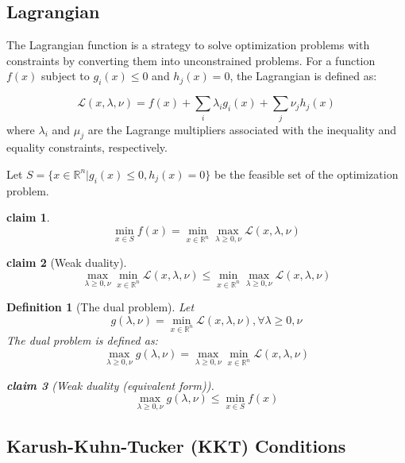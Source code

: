 \documentclass[11pt]{book} %
\newtheorem{definition}{Definition}[section]
\newtheorem{claim}{claim}[section]
\begin{document}
%
%

\subsection{Lagrangian}

The Lagrangian function is a strategy to solve optimization problems with constraints by converting them into unconstrained problems. For a function \( f(x) \) subject to \( g_i(x) \leq 0 \) and \( h_j(x) = 0 \), the Lagrangian is defined as:

\[
\mathcal{L}(x, \lambda, \nu ) = f(x) + \sum_{i}\lambda_i g_i(x) + \sum_{j}\nu_j h_j(x)
\]
where \( \lambda_i \) and \( \mu_j \) are the Lagrange multipliers associated with the inequality and equality constraints, respectively.

Let $S = \{x \in \mathbb{R}^n | g_i(x) \leq 0, h_j(x) = 0\}$ be the feasible set of the optimization problem. 
\begin{claim}
\[
    \min_{x \in S} f(x) = \min_{x \in \mathbb{R}^n} \max_{\lambda \geq 0, \nu} \mathcal{L}(x, \lambda, \nu)
\]
\end{claim}

\begin{claim}[Weak duality]
\[
    \max_{\lambda \geq 0, \nu} \min_{x \in \mathbb{R}^n} \mathcal{L}(x, \lambda, \nu) \leq \min_{x \in \mathbb{R}^n} \max_{\lambda \geq 0, \nu} \mathcal{L}(x, \lambda, \nu)
\]  
\end{claim}

\begin{definition}[The dual problem]
Let 
\[
  g(\lambda, \nu) = \min_{x \in \mathbb{R}^n} \mathcal{L}(x, \lambda, \nu),        \forall \lambda \geq 0, \nu  
\]
The dual problem is defined as:
\[
    \max_{\lambda \geq 0, \nu} g(\lambda, \nu) = \max_{\lambda \geq 0, \nu} \min_{x \in \mathbb{R}^n} \mathcal{L}(x, \lambda, \nu)
\]

\begin{claim}[Weak duality (equivalent form)]
\[
    \max_{\lambda \geq 0, \nu} g(\lambda, \nu) \leq \min_{x \in S} f(x)
\]
\end{claim}
\end{definition}

\subsection{Karush-Kuhn-Tucker (KKT) Conditions}
\end{document}
